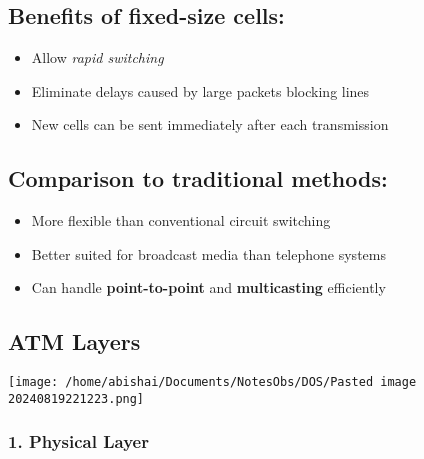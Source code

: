 \documentclass[
]{article}
\providecommand{\tightlist}{%
  \setlength{\itemsep}{0pt}\setlength{\parskip}{0pt}}
\begin{document}
\hypertarget{benefits-of-fixed-size-cells}{%
\subsection{Benefits of fixed-size
cells:}\label{benefits-of-fixed-size-cells}}

\begin{itemize}
\tightlist
\item
  Allow \emph{rapid switching}
\item
  Eliminate delays caused by large packets blocking lines
\item
  New cells can be sent immediately after each transmission
\end{itemize}

\hypertarget{comparison-to-traditional-methods}{%
\subsection{Comparison to traditional
methods:}\label{comparison-to-traditional-methods}}

\begin{itemize}
\tightlist
\item
  More flexible than conventional circuit switching
\item
  Better suited for broadcast media than telephone systems
\item
  Can handle \textbf{point-to-point} and \textbf{multicasting}
  efficiently
\end{itemize}

\hypertarget{atm-layers}{%
\subsection{ATM Layers}\label{atm-layers}}

\texttt{[image: /home/abishai/Documents/NotesObs/DOS/Pasted image 20240819221223.png]}

\hypertarget{physical-layer}{%
\subsubsection{1. Physical Layer}\label{physical-layer}}
\end{document}
